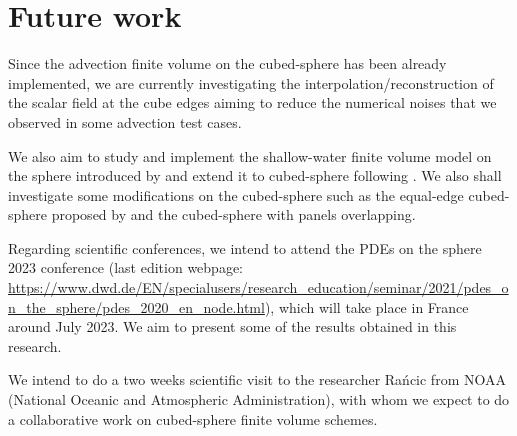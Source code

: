 \chapter{Future work}
\label{chp-conclusions}
Since the advection finite volume on the cubed-sphere has been already implemented,
we are currently investigating the interpolation/reconstruction of the scalar field
at the cube edges aiming to reduce the numerical noises that we observed in some advection
test cases.

We also aim to study and implement the shallow-water finite volume model
on the sphere introduced by \citet{lin:1997} and extend it to cubed-sphere following \cite{putman:2007}.
We also shall investigate some modifications on the cubed-sphere
such as the equal-edge cubed-sphere proposed by \cite{chen:2021} and the
cubed-sphere with panels overlapping.

Regarding scientific conferences, we intend to attend the PDEs on the sphere 2023 conference
(last edition webpage: \url{https://www.dwd.de/EN/specialusers/research_education/seminar/2021/pdes_on_the_sphere/pdes_2020_en_node.html}), which will take place in France around July 2023.
We aim to present some of the results obtained in this research.

We intend to do a two weeks scientific visit to the researcher Rańcic from NOAA 
(National Oceanic and Atmospheric Administration), with whom we expect to do a collaborative
work on cubed-sphere finite volume schemes.
